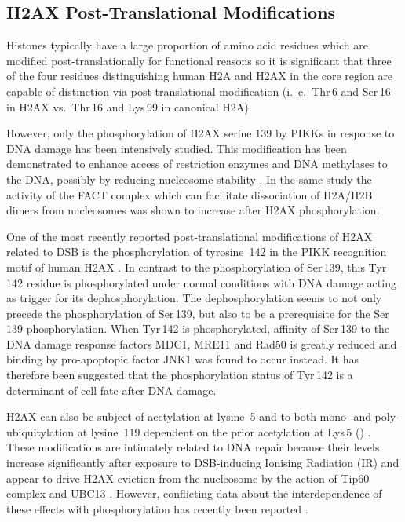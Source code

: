 \subsection{H2AX Post-Translational Modifications}
\label{subsec:h2ax-review:H2AX-PTM}
Histones typically have a large proportion of amino acid residues which are modified post-translationally
for functional reasons so it is significant that three of the four residues distinguishing human H2A
and H2AX in the core region are capable of distinction via post-translational modification
(i.~e.\ Thr\,6 and Ser\,16 in H2AX vs.\ Thr\,16 and Lys\,99 in canonical H2A).

However, only the phosphorylation of H2AX serine 139 by PIKKs in response to DNA damage has been
intensively studied. This modification has been demonstrated to enhance access of restriction
enzymes and DNA methylases to the DNA, possibly by reducing nucleosome stability \citep{KHHK+08}. In
the same study the activity of the FACT complex which can facilitate dissociation of H2A/H2B dimers
from nucleosomes was shown to increase after H2AX phosphorylation.

One of the most recently reported post-translational modifications of H2AX related to DSB is the
phosphorylation of tyrosine~142 in the PIKK recognition motif of human H2AX \citep{XLS+09,CJT+09}. In
contrast to the phosphorylation of Ser\,139, this Tyr\,142 residue is phosphorylated under normal
conditions with DNA damage acting as trigger for its dephosphorylation. The dephosphorylation seems
to not only precede the phosphorylation of Ser\,139, but also to be a prerequisite for the Ser\,139
phosphorylation. When Tyr\,142 is phosphorylated, affinity of Ser\,139 to the DNA damage response
factors MDC1, MRE11 and Rad50 is greatly reduced and binding by pro-apoptopic factor JNK1 was found
to occur instead. It has therefore been suggested that the phosphorylation status of Tyr\,142 is a
determinant of cell fate after DNA damage.

H2AX can also be subject of acetylation at lysine~5 \citep{PB81} and to both mono- and poly-ubiquitylation
at lysine~119 dependent on the prior acetylation at Lys\,5 () \citep{ITK+07}. These
modifications are intimately related to DNA repair because their levels increase significantly after
exposure to DSB-inducing Ionising Radiation (IR) and appear to drive H2AX eviction from the nucleosome
by the action of Tip60 complex and UBC13 \citep{ITK+07}. However, conflicting data about the
interdependence of these effects with phosphorylation has recently been reported \citep{RVD+09}.

